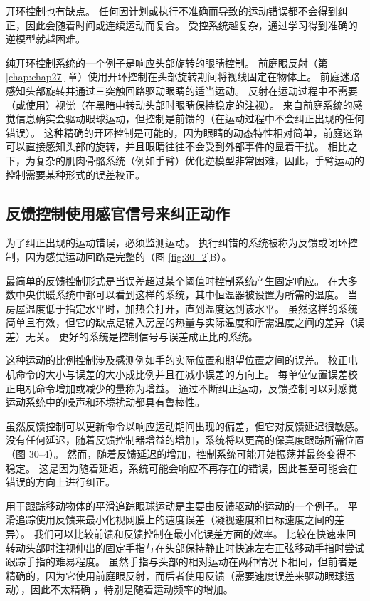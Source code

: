 开环控制也有缺点。 任何因计划或执行不准确而导致的运动错误都不会得到纠正，因此会随着时间或连续运动而复合。 受控系统越复杂，通过学习得到准确的逆模型就越困难。

纯开环控制系统的一个例子是响应头部旋转的眼睛控制。 前庭眼反射（第 \ref{chap:chap27} 章）使用开环控制在头部旋转期间将视线固定在物体上。 前庭迷路感知头部旋转并通过三突触回路驱动眼睛的适当运动。 反射在运动过程中不需要（或使用）视觉（在黑暗中转动头部时眼睛保持稳定的注视）。 来自前庭系统的感觉信息确实会驱动眼球运动，但控制是前馈的（在运动过程中不会纠正出现的任何错误）。 这种精确的开环控制是可能的，因为眼睛的动态特性相对简单，前庭迷路可以直接感知头部的旋转，并且眼睛往往不会受到外部事件的显着干扰。 相比之下，为复杂的肌肉骨骼系统（例如手臂）优化逆模型非常困难，因此，手臂运动的控制需要某种形式的误差校正。


\subsection{反馈控制使用感官信号来纠正动作}

为了纠正出现的运动错误，必须监测运动。 执行纠错的系统被称为反馈或闭环控制，因为感觉运动回路是完整的（图 \ref{fig:30_2}B）。

最简单的反馈控制形式是当误差超过某个阈值时控制系统产生固定响应。 在大多数中央供暖系统中都可以看到这样的系统，其中恒温器被设置为所需的温度。 当房屋温度低于指定水平时，加热会打开，直到温度达到该水平。 虽然这样的系统简单且有效，但它的缺点是输入房屋的热量与实际温度和所需温度之间的差异（误差）无关。 更好的系统是控制信号与误差成正比的系统。

这种运动的比例控制涉及感测例如手的实际位置和期望位置之间的误差。 校正电机命令的大小与误差的大小成比例并且在减小误差的方向上。 每单位位置误差校正电机命令增加或减少的量称为增益。 通过不断纠正运动，反馈控制可以对感觉运动系统中的噪声和环境扰动都具有鲁棒性。

虽然反馈控制可以更新命令以响应运动期间出现的偏差，但它对反馈延迟很敏感。 没有任何延迟，随着反馈控制器增益的增加，系统将以更高的保真度跟踪所需位置（图 30–4）。 然而，随着反馈延迟的增加，控制系统可能开始振荡并最终变得不稳定。 这是因为随着延迟，系统可能会响应不再存在的错误，因此甚至可能会在错误的方向上进行纠正。

用于跟踪移动物体的平滑追踪眼球运动是主要由反馈驱动的运动的一个例子。 平滑追踪使用反馈来最小化视网膜上的速度误差（凝视速度和目标速度之间的差异）。 我们可以比较前馈和反馈控制在最小化误差方面的效率。 比较在快速来回转动头部时注视伸出的固定手指与在头部保持静止时快速左右正弦移动手指时尝试跟踪手指的难易程度。 虽然手指与头部的相对运动在两种情况下相同，但前者是精确的，因为它使用前庭眼反射，而后者使用反馈（需要速度误差来驱动眼球运动），因此不太精确 ，特别是随着运动频率的增加。

